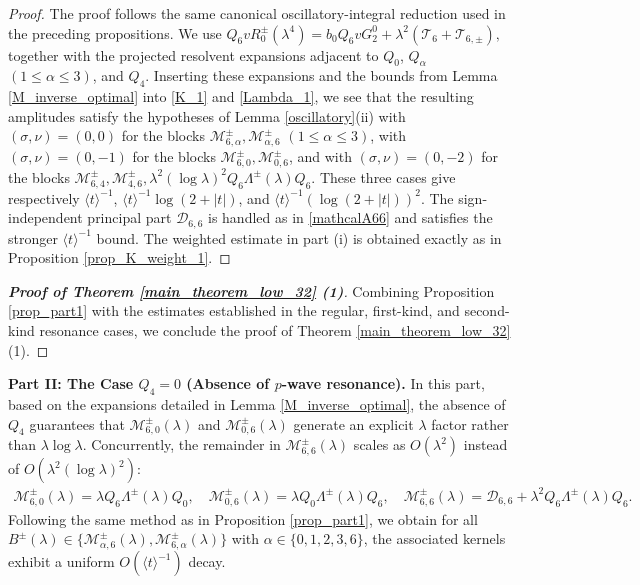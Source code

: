 \documentclass[reqno]{amsart}
\numberwithin{equation}{section}
\begin{document}
\begin{proof}
	The proof follows the same canonical oscillatory-integral reduction
	used in the preceding propositions.  We use
	$
	Q_6vR_0^\pm(\lambda^4)
	=
	b_0Q_6vG_2^0
	+
	\lambda^2(\mathcal T_6+\mathcal T_{6,\pm}),
	$
	together with the projected resolvent expansions adjacent to
	$Q_0$, $Q_\alpha$ $(1\leq\alpha\leq3)$, and $Q_4$. Inserting
	these expansions and the bounds from Lemma
	\ref{M_inverse_optimal} into \eqref{K_1} and \eqref{Lambda_1}, we see that the
	resulting amplitudes satisfy the hypotheses of Lemma
	\ref{oscillatory}(ii) with $(\sigma,\nu)=(0,0)$ for the blocks
	$\mathcal M_{6,\alpha}^\pm,\mathcal M_{\alpha,6}^\pm$
	$(1\leq\alpha\leq3)$, with $(\sigma,\nu)=(0,-1)$ for the blocks
	$\mathcal M_{6,0}^\pm,\mathcal M_{0,6}^\pm$, and with
	$(\sigma,\nu)=(0,-2)$ for the blocks
	$\mathcal M_{6,4}^\pm,\mathcal M_{4,6}^\pm,\lambda^2 (\log \lambda)^2Q_6 \Lambda^\pm(\lambda)Q_6$.
	These three cases give respectively
	$\langle t\rangle^{-1}$,
	$\langle t\rangle^{-1}\log(2+|t|)$, and
	$\langle t\rangle^{-1}(\log(2+|t|))^2$. The sign-independent
	principal part $\mathcal D_{6,6}$ is handled as in
	\eqref{mathcalA66} and satisfies the stronger
	$\langle t\rangle^{-1}$ bound. 
    The weighted estimate in part (i)
	is obtained exactly as in Proposition \ref{prop_K_weight_1}.
\end{proof}


\begin{proof}[\textbf{Proof of Theorem \ref{main_theorem_low_32} (1)}]  
	Combining  Proposition \ref{prop_part1} with the  estimates established  in the regular, first-kind, and second-kind resonance cases,
	we conclude the proof of Theorem \ref{main_theorem_low_32}(1).  
\end{proof}  

\vspace{0.3cm}  
\textbf{Part II: The Case $Q_4 = 0$ (Absence of $p$-wave resonance).}  
In this part, based on the expansions detailed in Lemma \ref{M_inverse_optimal}, the absence of $Q_4$ guarantees that  $\mathcal{M}_{6,0}^{\pm}(\lambda)$ and $\mathcal{M}_{0,6}^{\pm}(\lambda)$ generate an explicit  $\lambda$ factor rather than $\lambda\log\lambda$. Concurrently, the remainder in $\mathcal{M}_{6,6}^{\pm}(\lambda)$ scales as ${O}(\lambda^2)$ instead of ${O}(\lambda^2(\log\lambda)^2)$:
\begin{align}\label{Q4=Q5}
\mathcal{M}_{6,0}^{\pm}(\lambda) = \lambda Q_6 \Lambda^\pm(\lambda)Q_0, \quad 
\mathcal{M}_{0,6}^{\pm}(\lambda) = \lambda Q_0 \Lambda^\pm(\lambda)Q_6, \quad 
\mathcal{M}_{6,6}^{\pm}(\lambda) = \mathcal{D}_{6,6} + \lambda^2 Q_6 \Lambda^\pm(\lambda)Q_6.
\end{align}
Following the same method as in Proposition \ref{prop_part1}, we obtain  for all $B^\pm(\lambda) \in \{ \mathcal{M}_{\alpha,6}^{\pm}(\lambda), \mathcal{M}_{6,\alpha}^{\pm}(\lambda) \}$ with $\alpha \in \{0,1,2,3,6\}$, the associated kernels exhibit a uniform ${O}(\langle t \rangle^{-1})$ decay. 
\end{document}
